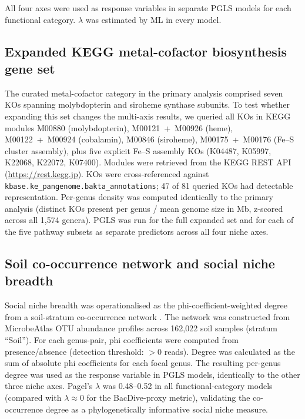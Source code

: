 \documentclass[times]{zHenriquesLab-StyleBioRxiv}
\begin{document}
All four axes were used as response variables in separate PGLS models for each
functional category. $\lambda$ was estimated by ML in every model.

\subsection{Expanded KEGG metal-cofactor biosynthesis gene set}

The curated metal-cofactor category in the primary analysis comprised seven KOs
spanning molybdopterin and siroheme synthase subunits. To test whether expanding
this set changes the multi-axis results, we queried all KOs in KEGG modules
M00880 (molybdopterin), M00121~+~M00926 (heme), M00122~+~M00924 (cobalamin),
M00846 (siroheme), M00175~+~M00176 (Fe--S cluster assembly), plus five explicit
Fe--S assembly KOs (K04487, K05997, K22068, K22072, K07400). Modules were
retrieved from the KEGG REST API (\url{https://rest.kegg.jp}). KOs were
cross-referenced against \texttt{kbase.ke\_pangenome.bakta\_annotations}; 47
of 81 queried KOs had detectable representation. Per-genus density was
computed identically to the primary analysis (distinct KOs present per genus /
mean genome size in Mb, z-scored across all 1,574 genera). PGLS was run for the
full expanded set and for each of the five pathway subsets as separate predictors
across all four niche axes.

\subsection{Soil co-occurrence network and social niche breadth}

Social niche breadth was operationalised as the phi-coefficient-weighted degree
from a soil-stratum co-occurrence network \cite{veech2013}. The network was
constructed from MicrobeAtlas OTU abundance profiles across 162,022 soil samples
(stratum ``Soil''). For each genus-pair, phi coefficients were computed from
presence/absence (detection threshold: $> 0$ reads). Degree was calculated as the
sum of absolute phi coefficients for each focal genus. The resulting per-genus
degree was used as the response variable in PGLS models, identically to the other
three niche axes. Pagel's $\lambda$ was 0.48--0.52 in all functional-category
models (compared with $\lambda \approx 0$ for the BacDive-proxy metric), validating
the co-occurrence degree as a phylogenetically informative social niche measure.
\end{document}

